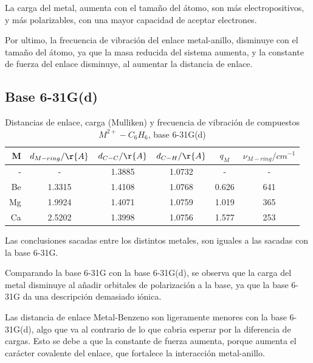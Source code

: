 \documentclass[12pt]{article}
\begin{document}
La carga del metal, aumenta con el tamaño del átomo, son más electropositivos, y más polarizables, con una mayor capacidad de aceptar electrones.

Por ultimo, la frecuencia de vibración del enlace metal-anillo, disminuye con el tamaño del átomo, ya que la masa reducida del sistema aumenta, y la constante de fuerza del enlace disminuye, al aumentar la distancia de enlace.

\subsection{Base 6-31G(d)}
\begin{table}[H]
    \centering
    \begin{tabular}{rccccc}
        \hline
        M  & $d_{M-ring}/\r{A}$ & $d_{C-C}/\r{A}$ & $d_{C-H}/\r{A}$ & $q_{M}$ & $\nu_{M-ring}/cm^{-1}$ \\
        \hline
        -  & -               & 1.3885          & 1.0732          & -       & -               \\
        Be & 1.3315          & 1.4108          & 1.0768          & 0.626   & 641             \\
        Mg & 1.9924          & 1.4071          & 1.0759          & 1.019   & 365             \\
        Ca & 2.5202          & 1.3998          & 1.0756          & 1.577   & 253             \\
        \hline
    \end{tabular}
    \caption{Distancias de enlace, carga (Mulliken) y frecuencia de vibración de compuestos $M^{2+}-C_6H_6$, base 6-31G(d)}
\end{table}

Las conclusiones sacadas entre los distintos metales, son iguales a las sacadas con la base 6-31G.

Comparando la base 6-31G con la base 6-31G(d), se observa que la carga del metal disminuye al añadir orbitales de polarización a la base, ya que la base 6-31G da una descripción demasiado iónica. 

Las distancia de enlace Metal-Benzeno son ligeramente menores con la base 6-31G(d), algo que va al contrario de lo que cabria esperar por la diferencia de cargas. Esto se debe a que la constante de fuerza aumenta, porque aumenta el carácter covalente del enlace, que fortalece la interacción metal-anillo.




\newpage
\end{document}
